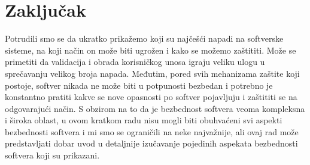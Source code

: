 \documentclass[a4paper]{article}
\begin{document}
\section{Zaključak}
\label{sec:zakljucak}
Potrudili smo se da ukratko prikažemo koji su najčešći napadi na softverske sisteme, na koji način on može biti ugrožen i kako se možemo zaštititi. Može se primetiti da validacija i obrada korisničkog unosa igraju veliku ulogu u sprečavanju velikog broja napada. Međutim, pored svih mehanizama zaštite koji postoje, softver nikada ne može biti u potpunosti bezbedan i potrebno je konstantno pratiti kakve se nove opasnosti po softver pojavljuju i zaštititi se na odgovarajući način. S obzirom na to da je bezbednost softvera veoma kompleksna i široka oblast, u ovom kratkom radu nisu mogli biti obuhvaćeni svi aspekti bezbednosti softvera i mi smo se ograničili na neke najvažnije, ali ovaj rad može predstavljati dobar uvod u detaljnije izučavanje pojedinih aspekata bezbednosti softvera koji su prikazani.

\appendix
 

\end{document}
